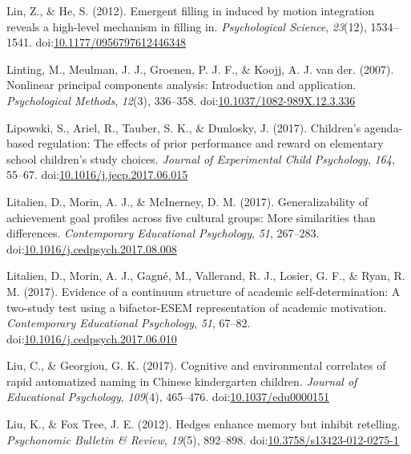 \documentclass[english,man]{apa6}
\theoremstyle{definition}
\theoremstyle{definition}
\theoremstyle{definition}
\theoremstyle{remark}
\begin{document}
\hypertarget{ref-Lin2012a}{}
Lin, Z., \& He, S. (2012). Emergent filling in induced by motion
integration reveals a high-level mechanism in filling in.
\emph{Psychological Science}, \emph{23}(12), 1534--1541.
doi:\href{https://doi.org/10.1177/0956797612446348}{10.1177/0956797612446348}

\hypertarget{ref-Linting2007}{}
Linting, M., Meulman, J. J., Groenen, P. J. F., \& Koojj, A. J. van der.
(2007). Nonlinear principal components analysis: Introduction and
application. \emph{Psychological Methods}, \emph{12}(3), 336--358.
doi:\href{https://doi.org/10.1037/1082-989X.12.3.336}{10.1037/1082-989X.12.3.336}

\hypertarget{ref-Lipowski2017}{}
Lipowski, S., Ariel, R., Tauber, S. K., \& Dunlosky, J. (2017).
Children's agenda-based regulation: The effects of prior performance and
reward on elementary school children's study choices. \emph{Journal of
Experimental Child Psychology}, \emph{164}, 55--67.
doi:\href{https://doi.org/10.1016/j.jecp.2017.06.015}{10.1016/j.jecp.2017.06.015}

\hypertarget{ref-Litalien2017a}{}
Litalien, D., Morin, A. J., \& McInerney, D. M. (2017). Generalizability
of achievement goal profiles across five cultural groups: More
similarities than differences. \emph{Contemporary Educational
Psychology}, \emph{51}, 267--283.
doi:\href{https://doi.org/10.1016/j.cedpsych.2017.08.008}{10.1016/j.cedpsych.2017.08.008}

\hypertarget{ref-Litalien2017}{}
Litalien, D., Morin, A. J., Gagné, M., Vallerand, R. J., Losier, G. F.,
\& Ryan, R. M. (2017). Evidence of a continuum structure of academic
self-determination: A two-study test using a bifactor-ESEM
representation of academic motivation. \emph{Contemporary Educational
Psychology}, \emph{51}, 67--82.
doi:\href{https://doi.org/10.1016/j.cedpsych.2017.06.010}{10.1016/j.cedpsych.2017.06.010}

\hypertarget{ref-Liu2017a}{}
Liu, C., \& Georgiou, G. K. (2017). Cognitive and environmental
correlates of rapid automatized naming in Chinese kindergarten children.
\emph{Journal of Educational Psychology}, \emph{109}(4), 465--476.
doi:\href{https://doi.org/10.1037/edu0000151}{10.1037/edu0000151}

\hypertarget{ref-Liu2012a}{}
Liu, K., \& Fox Tree, J. E. (2012). Hedges enhance memory but inhibit
retelling. \emph{Psychonomic Bulletin \& Review}, \emph{19}(5),
892--898.
doi:\href{https://doi.org/10.3758/s13423-012-0275-1}{10.3758/s13423-012-0275-1}
\end{document}
